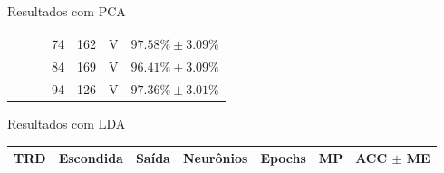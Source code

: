 \begin{frame}{Resultados com PCA}
\begin{tabularx}{\linewidth}{| c | c | c | c | c | c | c |}
                                      &                         &                          & 74 & 162 & V & $97.58\% \pm 3.09\%$\\
                                      &                         &                          & 84 & 169 & V & $96.41\% \pm 3.09\%$\\
                                      &                         &                          & 94 & 126 & V & $97.36\% \pm 3.01\%$\\
                \bottomrule
        \end{tabularx}
\end{frame}

\begin{frame}{Resultados com LDA}
	\footnotesize
        \begin{tabularx}{\linewidth}{| c | c | c | c | c | c | c |}
                \toprule
                TRD & Escondida & Saída & Neurônios & Epochs & MP & ACC $\pm$ ME\\
                \midrule
                \endhead


\end{tabularx}
\end{frame}
